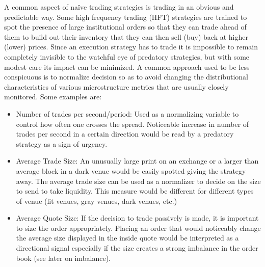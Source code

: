 A common aspect of na\"ive trading strategies is trading in an obvious and predictable way. Some high frequency trading (HFT) strategies are trained to spot the presence of large institutional orders so that they can trade ahead of them to build out their inventory that they can then sell (buy) back at higher (lower) prices. Since an execution strategy has to trade it is impossible to remain completely invisible to the watchful eye of predatory strategies, but with some modest care its impact can be minimized. A common approach used to be less conspicuous is to normalize decision so as to avoid changing the distributional characteristics of various microstructure metrics that are usually closely monitored.  Some examples are:
        \begin{itemize}
        	\item Number of trades per second/period: Used as a normalizing variable to control how often one crosses the spread. Noticeable increase in number of trades per second in a certain direction would be read by a predatory strategy as a sign of urgency.
        	\item Average Trade Size: An unusually large print on an exchange or a larger than average block in a dark venue would be easily spotted giving the strategy away. The average trade size can be used as a normalizer to decide on the size to send to take liquidity.  This measure would be different for different types of venue (lit venues, gray venues, dark venues, etc.)
        	\item Average Quote Size: If the decision to trade passively is made, it is important to size the order appropriately. Placing an order that would noticeably change the average size displayed in the inside quote would be interpreted as a directional signal especially if the size creates a strong imbalance in the order book (see later on imbalance).
        \end{itemize}


